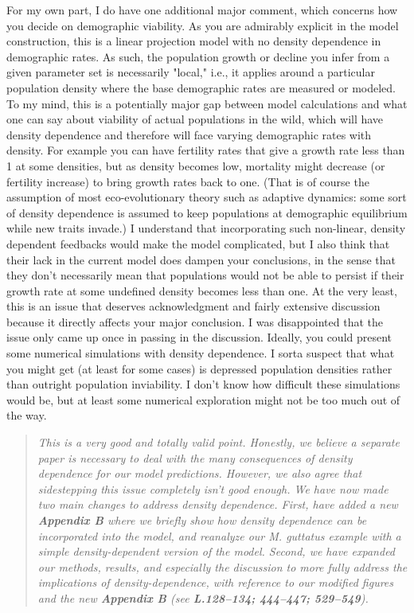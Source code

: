 \documentclass[11pt]{article}
\begin{document}
For my own part, I do have one additional major comment, which concerns how you decide on demographic viability. As you are admirably explicit in the model construction, this is a linear projection model with no density dependence in demographic rates. As such, the population growth or decline you infer from a given parameter set is necessarily "local," i.e., it applies around a particular population density where the base demographic rates are measured or modeled. To my mind, this is a potentially major gap between model calculations and what one can say about viability of actual populations in the wild, which will have density dependence and therefore will face varying demographic rates with density. For example you can have fertility rates that give a growth rate less than 1 at some densities, but as density becomes low, mortality might decrease (or fertility increase) to bring growth rates back to one. (That is of course the assumption of most eco-evolutionary theory such as adaptive dynamics: some sort of density dependence is assumed to keep populations at demographic equilibrium while new traits invade.) I understand that incorporating such non-linear, density dependent feedbacks would make the model complicated, but I also think that their lack in the current model does dampen your conclusions, in the sense that they don’t necessarily mean that populations would not be able to persist if their growth rate at some undefined density becomes less than one. At the very least, this is an issue that deserves acknowledgment and fairly extensive discussion because it directly affects your major conclusion. I was disappointed that the issue only came up once in passing in the discussion. Ideally, you could present some numerical simulations with density dependence. I sorta suspect that what you might get (at least for some cases) is depressed population densities rather than outright population inviability. I don’t know how difficult these simulations would be, but at least some numerical exploration might not be too much out of the way.

\begin{quote}
	{\itshape This is a very good and totally valid point. Honestly, we believe a separate paper is necessary to deal with the many consequences of density dependence for our model predictions. However, we also agree that sidestepping this issue completely isn't good enough. We have now made two main changes to address density dependence. First, have added a new {\bf Appendix B} where we briefly show how density dependence can be incorporated into the model, and reanalyze our {\itshape M. guttatus} example with a simple density-dependent version of the model. Second, we have expanded our methods, results, and especially the discussion to more fully address the implications of density-dependence, with reference to our modified figures and the new {\bf Appendix B} (see {\bf L.128--134; 444--447; 529--549}).}
\end{quote}
\end{document}
